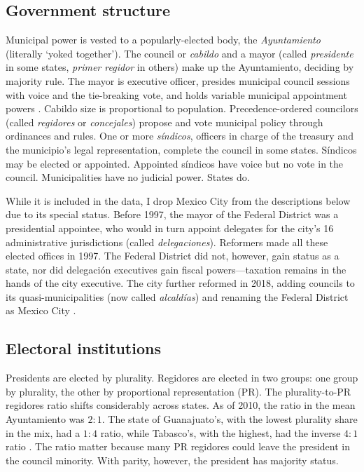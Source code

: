 \documentclass[letter,12pt]{article}
\begin{document}
\subsection{Government structure}\label{S:structure}
Municipal power is vested to a popularly-elected body, the \emph{Ayuntamiento} (literally `yoked together'). The council or \emph{cabildo} and a mayor (called \emph{presidente} in some states, \emph{primer regidor} in others) make up the Ayuntamiento, deciding by majority rule. The mayor is executive officer, presides municipal council sessions with voice and the tie-breaking vote, and holds variable municipal appointment powers \citep{robles-mtz.Municipio.2009, rmz-millan.2000}. Cabildo size is proportional to population. Precedence-ordered councilors (called \emph{regidores} or \emph{concejales}) propose and vote municipal policy through ordinances and rules. One or more \emph{síndicos}, officers in charge of the treasury and the municipio's legal representation, complete the council in some states. Síndicos may be elected or appointed. Appointed síndicos have voice but no vote in the council. Municipalities have no judicial power. States do.

While it is included in the data, I drop Mexico City from the descriptions below due to its special status. Before 1997, the mayor of the Federal District was a presidential appointee, who would in turn appoint delegates for the city's 16 administrative jurisdictions (called \emph{delegaciones}). Reformers made all these elected offices in 1997. The Federal District did not, however, gain status as a state, nor did delegación executives gain fiscal powers---taxation remains in the hands of the city executive. The city further reformed in 2018, adding councils to its quasi-municipalities (now called \emph{alcaldías}) and renaming the Federal District as Mexico City \citep{rabell.2017}. 

\subsection{Electoral institutions}
Presidents are elected by plurality. Regidores are elected in two groups: one group by plurality, the other by proportional representation (PR). The plurality-to-PR regidores ratio shifts considerably across states. As of 2010, the ratio in the mean Ayuntamiento was $2:1$. The state of Guanajuato's, with the lowest plurality share in the mix, had a $1:4$ ratio, while Tabasco's, with the highest, had the inverse $4:1$ ratio \citep[][:14]{gil.2010}. The ratio matter because many PR regidores could leave the president in the council minority. With parity, however, the president has majority status.
\end{document}
